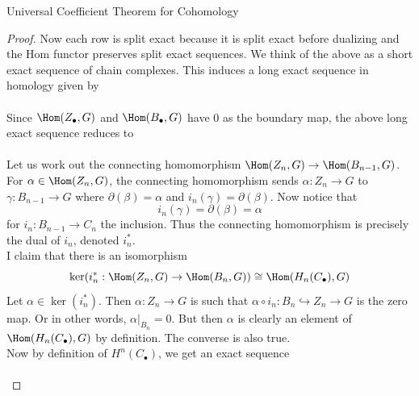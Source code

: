 \documentclass[a4paper]{article}
\begin{document}
\begin{thm}{Universal Coefficient Theorem for Cohomology}{}
\begin{proof}
Now each row is split exact because it is split exact before dualizing and the Hom functor preserves split exact sequences. We think of the above as a short exact sequence of chain complexes. This induces a long exact sequence in homology given by \\
\\
Since $\Hom(Z_\bullet,G)$ and $\Hom(B_\bullet,G)$ have $0$ as the boundary map, the above long exact sequence reduces to \\
\\
Let us work out the connecting homomorphism $\Hom(Z_n,G)\to\Hom(B_{n-1},G)$. For $\alpha\in\Hom(Z_n,G)$, the connecting homomorphism sends $\alpha:Z_n\to G$ to $\gamma:B_{n-1}\to G$ where $\partial(\beta)=\alpha$ and $i_n(\gamma)=\partial(\beta)$. Now notice that $$i_n(\gamma)=\partial(\beta)=\alpha$$ for $i_n:B_{n-1}\to C_n$ the inclusion. Thus the connecting homomorphism is precisely the dual of $i_n$, denoted $i_n^\ast$. \\

I claim that there is an isomorphism $$\ker(i_n^\ast:\Hom(Z_n,G)\to\Hom(B_n,G))\cong\Hom(H_n(C_\bullet),G)$$ Let $\alpha\in\ker(i_n^\ast)$. Then $\alpha:Z_n\to G$ is such that $\alpha\circ i_n:B_n\hookrightarrow Z_n\to G$ is the zero map. Or in other words, $\alpha|_{B_n}=0$. But then $\alpha$ is clearly an element of $\Hom(H_n(C_\bullet),G)$ by definition. The converse is also true. \\

Now by definition of $H^n(C_\bullet)$, we get an exact sequence \\
\\


\end{proof}
\end{thm}
\end{document}
